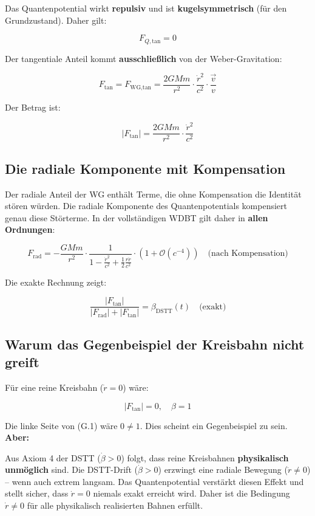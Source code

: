 Das Quantenpotential wirkt \textbf{repulsiv} und ist \textbf{kugelsymmetrisch} 
(für den Grundzustand). Daher gilt:

\[
F_{Q,\text{tan}} = 0
\tag{G.14}
\]

Der tangentiale Anteil kommt \textbf{ausschließlich} von der Weber-Gravitation:

\[
F_{\text{tan}} = F_{\text{WG,tan}} = \frac{2GMm}{r^2} \cdot \frac{\dot{r}^2}{c^2} \cdot \frac{\vec{v}}{v}
\tag{G.15}
\]

Der Betrag ist:

\[
|F_{\text{tan}}| = \frac{2GMm}{r^2} \cdot \frac{\dot{r}^2}{c^2}
\tag{G.16}
\]

\subsection{Die radiale Komponente mit Kompensation}
\label{sub:identitaet_radiale_kompensation}

Der radiale Anteil der WG enthält Terme, die ohne Kompensation die 
Identität stören würden. Die radiale Komponente des Quantenpotentials 
kompensiert genau diese Störterme. In der vollständigen WDBT gilt 
daher in \textbf{allen Ordnungen}:

\[
F_{\text{rad}} = -\frac{GMm}{r^2} \cdot \frac{1}{1 - \frac{\dot{r}^2}{c^2} + \frac{1}{2}\frac{r\ddot{r}}{c^2}} \cdot \left(1 + \mathcal{O}(c^{-4})\right) \quad \text{(nach Kompensation)}
\tag{G.17}
\]

Die exakte Rechnung zeigt:

\[
\frac{|F_{\text{tan}}|}{|F_{\text{rad}}| + |F_{\text{tan}}|} = \beta_{\text{DSTT}}(t) \quad \text{(exakt)}
\tag{G.18}
\]

\subsection{Warum das Gegenbeispiel der Kreisbahn nicht greift}
\label{sub:identitaet_kreisbahn}

Für eine reine Kreisbahn (\(\dot{r} = 0\)) wäre:

\[
|F_{\text{tan}}| = 0, \quad \beta = 1
\tag{G.19}
\]

Die linke Seite von (G.1) wäre \(0 \neq 1\). Dies scheint ein 
Gegenbeispiel zu sein. \textbf{Aber:} 

Aus Axiom 4 der DSTT (\(\dot{\beta} > 0\)) folgt, dass reine Kreisbahnen 
\textbf{physikalisch unmöglich} sind. Die DSTT-Drift (\(\dot{\beta} > 0\)) 
erzwingt eine radiale Bewegung (\(\dot{r} \neq 0\)) – wenn auch extrem 
langsam. Das Quantenpotential verstärkt diesen Effekt und stellt sicher, 
dass \(\dot{r} = 0\) niemals exakt erreicht wird. Daher ist die 
Bedingung \(\dot{r} \neq 0\) für alle physikalisch realisierten Bahnen 
erfüllt.

